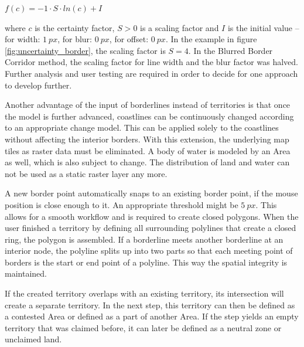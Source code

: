 \vspace{-1.5em}
\begin{center}
\begin{math}
    f(c) = -1 \cdot S \cdot ln(c) + I
\end{math}
\end{center}
\vspace{-1em}

where $c$ is the certainty factor, $S>0$ is a scaling factor and $I$ is the initial value -- for width: $1~px$, for blur: $0~px$, for offset: $0~px$. In the example in figure \ref{fig:uncertainty_border}, the scaling factor is $S=4$. In the Blurred Border Corridor method, the scaling factor for line width and the blur factor was halved. Further analysis and user testing are required in order to decide for one approach to develop further.

Another advantage of the input of borderlines instead of territories is that once the model is further advanced, coastlines can be continuously changed according to an appropriate change model. This can be applied solely to the coastlines without affecting the interior borders. With this extension, the underlying map tiles as raster data must be eliminated. A body of water is modeled by an Area as well, which is also subject to change. The distribution of land and water can not be used as a static raster layer any more.

A new border point automatically snaps to an existing border point, if the mouse position is close enough to it. An appropriate threshold might be $5~px$. This allows for a smooth workflow and is required to create closed polygons. When the user finished a territory by defining all surrounding polylines that create a closed ring, the polygon is assembled. If a borderline meets another borderline at an interior node, the polyline splits up into two parts so that each meeting point of borders is the start or end point of a polyline. This way the spatial integrity is maintained.

If the created territory overlaps with an existing territory, its intersection will create a separate territory. In the next step, this territory can then be defined as a contested Area or defined as a part of another Area. If the step yields an empty territory that was claimed before, it can later be defined as a neutral zone or unclaimed land.

